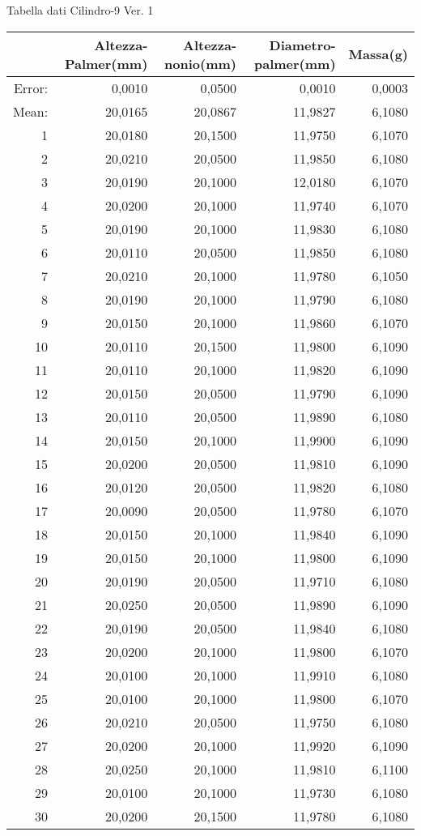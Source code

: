 \documentclass[11pt,a4paper,oneside,openany3] {report}
\begin{document}
Tabella dati Cilindro-9 Ver. 1
\begin{table}[ht]
\centering
\begin{tabular}{rrrrr}
  \hline
 & Altezza-Palmer(mm) & Altezza-nonio(mm) & Diametro-palmer(mm) & Massa(g) \\ 
  \hline
Error: & 0,0010 & 0,0500 & 0,0010 & 0,0003 \\[0.3cm]
  Mean: & 20,0165 & 20,0867 & 11,9827 & 6,1080 \\ 
  1 & 20,0180 & 20,1500 & 11,9750 & 6,1070 \\ 
  2 & 20,0210 & 20,0500 & 11,9850 & 6,1080 \\ 
  3 & 20,0190 & 20,1000 & 12,0180 & 6,1070 \\ 
  4 & 20,0200 & 20,1000 & 11,9740 & 6,1070 \\ 
  5 & 20,0190 & 20,1000 & 11,9830 & 6,1080 \\ 
  6 & 20,0110 & 20,0500 & 11,9850 & 6,1080 \\ 
  7 & 20,0210 & 20,1000 & 11,9780 & 6,1050 \\ 
  8 & 20,0190 & 20,1000 & 11,9790 & 6,1080 \\ 
  9 & 20,0150 & 20,1000 & 11,9860 & 6,1070 \\ 
  10 & 20,0110 & 20,1500 & 11,9800 & 6,1090 \\ 
  11 & 20,0110 & 20,1000 & 11,9820 & 6,1090 \\ 
  12 & 20,0150 & 20,0500 & 11,9790 & 6,1090 \\ 
  13 & 20,0110 & 20,0500 & 11,9890 & 6,1080 \\ 
  14 & 20,0150 & 20,1000 & 11,9900 & 6,1090 \\ 
  15 & 20,0200 & 20,0500 & 11,9810 & 6,1090 \\ 
  16 & 20,0120 & 20,0500 & 11,9820 & 6,1080 \\ 
  17 & 20,0090 & 20,0500 & 11,9780 & 6,1070 \\ 
  18 & 20,0150 & 20,1000 & 11,9840 & 6,1090 \\ 
  19 & 20,0150 & 20,1000 & 11,9800 & 6,1090 \\ 
  20 & 20,0190 & 20,0500 & 11,9710 & 6,1080 \\ 
  21 & 20,0250 & 20,0500 & 11,9890 & 6,1090 \\ 
  22 & 20,0190 & 20,0500 & 11,9840 & 6,1080 \\ 
  23 & 20,0200 & 20,1000 & 11,9800 & 6,1070 \\ 
  24 & 20,0100 & 20,1000 & 11,9910 & 6,1080 \\ 
  25 & 20,0100 & 20,1000 & 11,9800 & 6,1070 \\ 
  26 & 20,0210 & 20,0500 & 11,9750 & 6,1080 \\ 
  27 & 20,0200 & 20,1000 & 11,9920 & 6,1090 \\ 
  28 & 20,0250 & 20,1000 & 11,9810 & 6,1100 \\ 
  29 & 20,0100 & 20,1000 & 11,9730 & 6,1080 \\ 
  30 & 20,0200 & 20,1500 & 11,9780 & 6,1080 \\ 
   \hline
\end{tabular}
\end{table}
\end{document}
